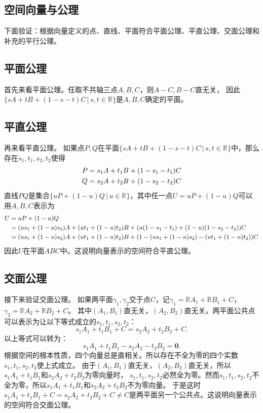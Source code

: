 \documentclass[12pt,UTF8]{ctexbook}
\begin{document}
\begin{appendix}
\chapter{空间向量与公理}

下面验证：根据向量定义的点、直线、平面符合平面公理、平直公理、交面公理和补充的平行公理。

\section{平面公理}
首先来看平面公理。任取不共轴三点$A,B,C$，则$A-C,B-C$直无关，
因此$ \{sA+tB+(1 - s - t)C \, | \,s, t\in\mathbb{R}\}$是$A,B,C$确定的平面。

\section{平直公理}
再来看平直公理。
如果点$P,Q$在平面$ \{sA+tB+(1 - s - t)C \, | \, s,t\in\mathbb{R}\}$中，那么存在$s_1, t_1, s_2, t_2$使得
\begin{align}
P &= s_1A + t_1B + (1 - s_1 - t_1)C \notag \\
Q &= s_2A + t_2B + (1 - s_2 - t_2)C \notag 
\end{align}
直线$PQ$是集合$\{uP+(1-u)Q \, | \, u\in \mathbb{R}\}$，其中任一点$U = uP+(1-u)Q$可以用$A,B,C$表示为
\begin{align}
U &= uP+(1-u)Q \notag \\
&= (us_1 + (1-u)s_2)A + (ut_1 + (1-u)t_2)B + (u(1 - s_1 - t_1) + (1-u)(1 - s_2 - t_2))C  \notag \\
&= (us_1 + (1-u)s_2)A + (ut_1 + (1-u)t_2)B + (1 - (us_1 + (1-u)s_2) - (ut_1 + (1-u)t_2))C \notag
\end{align}
因此$U$在平面$ABC$中。这说明向量表示的空间符合平直公理。

\section{交面公理}
接下来验证交面公理。
如果两平面$\gamma_1, \gamma_2$交于点$C$，记$\gamma_1 = \mathbb{R}A_1+\mathbb{R}B_1+C$，$\gamma_2 = \mathbb{R}A_2+\mathbb{R}B_2+C$。
其中$(A_1,B_1)$直无关，$(A_2,B_2)$直无关。两平面公共点可以表示为让以下等式成立的$s_1,t_1,s_2,t_2$：
$$ s_1A_1+t_1B_1+C = s_2A_2+t_2B_2+C. $$
以上等式可以转为：
$$ s_1A_1+t_1B_1 - s_2A_2 - t_2B_2 = \mathbf{0}. $$
根据空间的根本性质，四个向量总是直相关。所以存在不全为零的四个实数$s_1,t_1,s_2,t_2$使上式成立。
由于$(A_1,B_1)$直无关，$(A_2,B_2)$直无关，所以$s_1A_1+t_1B_1$和$s_2A_2 + t_2B_2$为零向量时，
$s_1,t_1,s_2,t_2$必然全为零。然而$s_1,t_1,s_2,t_2$不全为零，所以$s_1A_1+t_1B_1$和$s_2A_2 + t_2B_2$不为零向量。
于是这时$s_1A_1+t_1B_1+C = s_2A_2+t_2B_2+C\neq C$是两平面另一个公共点。这说明向量表示的空间符合交面公理。


\end{appendix}
\end{document}
